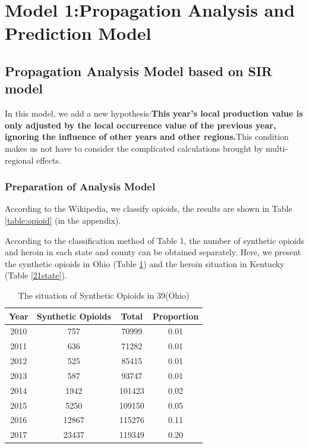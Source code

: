 \documentclass[12pt]{mcmthesis}
\begin{document}
\section{Model 1:Propagation Analysis and Prediction Model}

\subsection{Propagation Analysis Model based on SIR model}
In this model, we add a new hypothesis:\textbf{This year's local production value is only adjusted by the local occurrence value of the previous year, ignoring the influence of other years and other regions.}This condition makes us not have to consider the complicated calculations brought by multi-regional effects.
\subsubsection{Preparation of Analysis Model}
According to the Wikipedia\cite{wiki}, we classify opioids, the results are shown in Table \ref{table:opioid} (in the appendix).\par
According to the classification method of Table 1, the number of synthetic opioids and heroin in each state and county  can be obtained separately. Here, we present the synthetic opioids in Ohio (Table \ref{39state}) and the heroin situation in Kentucky (Table \ref{21state}).
\begin{table}[htb]
\centering
\caption{The situation of Synthetic Opioids in 39(Ohio)}\label{39state}
\begin{tabular}{|c|c|c|c|}
\hline
Year & Synthetic Opioids& Total&Proportion \\\hline
2010 & 757   & 70999  & 0.01 \\
2011 & 636   & 71282  & 0.01 \\
2012 & 525   & 85415  & 0.01 \\
2013 & 587   & 93747  & 0.01 \\
2014 & 1942  & 101423 & 0.02 \\
2015 & 5250  & 109150 & 0.05 \\
2016 & 12867 & 115276 & 0.11 \\
2017 & 23437 & 119349 & 0.20 \\\hline
\end{tabular}
\end{table}
\end{document}
